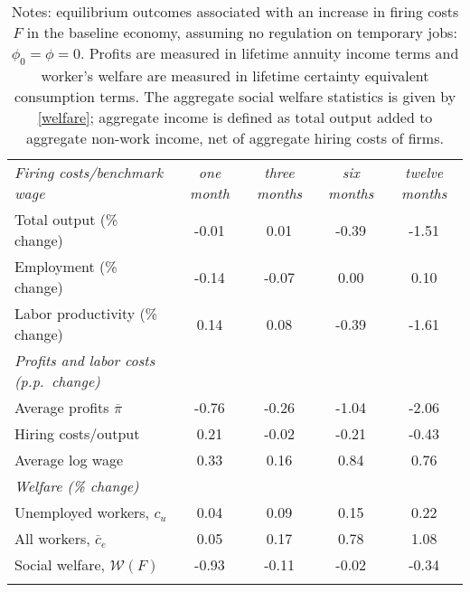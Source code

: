 \begin{table}[!h]
\centering
{}
\label{tab:welfare} 
\begin{tabular}{l c c c c}
\hline \hline
\addlinespace
\textit{Firing costs/benchmark wage}  & \textit{one month} & \textit{three months}  & \textit{six months}  & \textit{twelve months}\\
\addlinespace
\addlinespace
Total output (\% change) & -0.01 & 0.01 & -0.39 & -1.51\\
Employment (\% change) &-0.14 & -0.07 & 0.00 & 0.10\\
Labor productivity (\% change) & 0.14 & 0.08 & -0.39 & -1.61\\
\addlinespace
\textit{Profits and labor costs (p.p.\ change)}\\
\hspace{5pt} Average profits $\overline{\pi}$ & -0.76 & -0.26 & -1.04 & -2.06\\
\hspace{5pt} Hiring costs/output & 0.21 & -0.02 & -0.21 & -0.43\\
\hspace{5pt} Average log wage & 0.33 & 0.16 & 0.84 & 0.76\\
\addlinespace
\textit{Welfare (\% change)}\\
\hspace{5pt} Unemployed workers, ${c}_u$ \hspace{100pt}& 0.04 & 0.09 & 0.15 & 0.22\\
\hspace{5pt} All workers, $\overline{c}_e$ & 0.05 & 0.17 & 0.78 & 1.08\\
\hspace{5pt} Social welfare, $\mathcal{W}(F)$& -0.93 & -0.11 & -0.02 & -0.34\\
\addlinespace
\addlinespace
\hline \hline
\end{tabular}
\caption*{ \footnotesize Notes: equilibrium outcomes associated with an increase in firing costs $F$ in the baseline economy, assuming no regulation on temporary jobs: $\phi_0 = \phi = 0$. Profits are measured in lifetime annuity income terms and worker's welfare are measured in lifetime certainty equivalent consumption terms. The aggregate social welfare statistics is given by \eqref{welfare}; aggregate income is defined as total output added to aggregate non-work income, net of aggregate hiring costs of firms. }
\end{table}